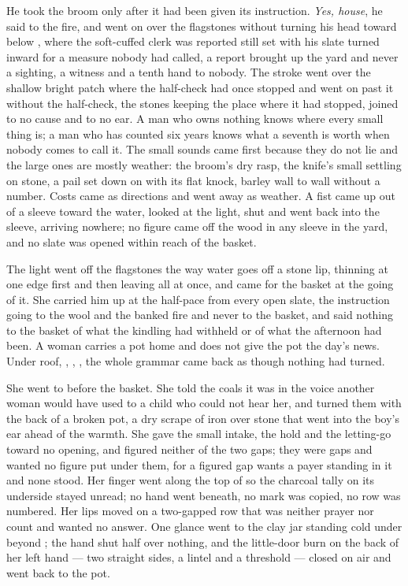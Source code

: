 He took the broom only after it had been given its instruction. \emph{Yes, house}, he said to the fire, and went on over the flagstones without turning his head toward  below , where the soft-cuffed clerk was reported still set with his slate turned inward for a measure nobody had called, a report brought up the yard and never a sighting, a witness and a tenth hand to nobody. The stroke went over the shallow bright patch where the half-check had once stopped and went on past it without the half-check, the stones keeping the place where it had stopped, joined to no cause and to no ear. A man who owns nothing knows where every small thing is; a man who has counted six years knows what a seventh is worth when nobody comes to call it. The small sounds came first because they do not lie and the large ones are mostly weather: the broom's dry rasp, the knife's small settling on stone, a pail set down on  with its flat knock, barley wall to wall without a number. Costs came as directions and went away as weather. A fist came up out of a sleeve toward the water, looked at the light, shut and went back into the sleeve, arriving nowhere; no figure came off the wood in any sleeve in the yard, and no slate was opened within reach of the basket.

\scenebreak

The light went off the flagstones the way water goes off a stone lip, thinning at one edge first and then leaving all at once, and  came for the basket at the going of it. She carried him up  at the half-pace from every open slate, the instruction going to the wool and the banked fire and never to the basket, and said nothing to the basket of what the kindling had withheld or of what the afternoon had been. A woman carries a pot home and does not give the pot the day's news. Under  roof, , , , the whole grammar came back as though nothing had turned.

She went to  before the basket. She told the coals it was  in the voice another woman would have used to a child who could not hear her, and turned them with the back of a broken pot, a dry scrape of iron over stone that went into the boy's ear ahead of the warmth. She gave the small intake, the hold and the letting-go toward no opening, and figured neither of the two gaps; they were gaps and wanted no figure put under them, for a figured gap wants a payer standing in it and none stood. Her finger went along the top of  so the charcoal tally on its underside stayed unread; no hand went beneath, no mark was copied, no row was numbered. Her lips moved on a two-gapped row that was neither prayer nor count and wanted no answer. One glance went to the clay jar standing cold under  beyond ; the hand shut half over nothing, and the little-door burn on the back of her left hand --- two straight sides, a lintel and a threshold --- closed on air and went back to the pot.

